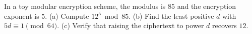 In a toy modular encryption scheme, the modulus is $85$ and the encryption exponent is $5$. (a) Compute $12^5\bmod 85$. (b) Find the least positive $d$ with $5d\equiv 1\pmod{64}$. (c) Verify that raising the ciphertext to power $d$ recovers $12$.
